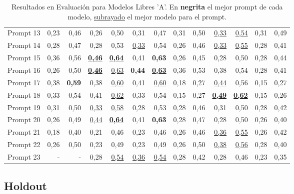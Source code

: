 \begin{table}[H]
{\begin{minipage}{\textheight}
{\begin{tabular}{l|rrrrrrrrrrrr}
Prompt 13 & 0,23 & 0,46 & 0,26 & 0,50 & 0,31 & 0,47 & 0,31 & 0,50 & \uline{0,33} & \uline{0,54} & 0,31 & 0,49 \\
Prompt 14 & 0,28 & 0,47 & 0,28 & 0,53 & \uline{0,33} & 0,54 & 0,26 & 0,46 & \uline{0,33} & \uline{0,55} & 0,28 & 0,41 \\
Prompt 15 & 0,36 & 0,56 & \uline{\textbf{0,46}} & \uline{\textbf{0,64}} & 0,41 & \textbf{0,63} & 0,26 & 0,45 & 0,28 & 0,50 & 0,28 & 0,44 \\
Prompt 16 & 0,26 & 0,50 & \uline{\textbf{0,46}} & \uline{0,63} & \textbf{0,44} & \uline{\textbf{0,63}} & 0,36 & 0,53 & 0,38 & 0,54 & 0,28 & 0,41 \\
Prompt 17 & 0,38 & \textbf{0,59} & 0,38 & \uline{0,60} & 0,41 & \uline{0,60} & 0,18 & 0,27 & \uline{0,44} & 0,56 & 0,15 & 0,27 \\
Prompt 18 & 0,33 & 0,54 & 0,41 & \uline{0,62} & 0,33 & 0,54 & 0,15 & 0,27 & \uline{\textbf{0,49}} & \uline{\textbf{0,62}} & 0,15 & 0,26 \\
Prompt 19 & 0,31 & 0,50 & \uline{0,33} & \uline{0,58} & 0,28 & 0,53 & 0,28 & 0,46 & 0,31 & 0,50 & 0,28 & 0,42 \\
Prompt 20 & 0,26 & 0,49 & \uline{0,44} & \uline{\textbf{0,64}} & 0,41 & \textbf{0,63} & 0,28 & 0,47 & 0,28 & 0,50 & 0,26 & 0,40 \\
Prompt 21 & 0,18 & 0,40 & 0,21 & 0,46 & 0,23 & 0,46 & 0,26 & 0,46 & \uline{0,36} & \uline{0,55} & 0,26 & 0,42 \\
Prompt 22 & 0,26 & 0,50 & 0,23 & 0,49 & 0,23 & 0,49 & 0,26 & 0,50 & \uline{0,38} & \uline{0,56} & 0,28 & 0,40 \\
Prompt 23 & - & - & 0,28 & \uline{0,54} & \uline{0,36} & \uline{0,54} & 0,28 & 0,42 & 0,28 & 0,46 & 0,23 & 0,35 \\
\hline
\end{tabular}
}%
\caption{Resultados en Evaluación para Modelos Libres 'A'.  En \textbf{negrita} el mejor prompt de cada modelo, \uline{subrayado} el mejor modelo para el prompt.}
\label{tab:resultados_3}
\end{minipage}%
}
\end{table}



\subsection{Holdout}\label{sec:tab_res_holdout}


